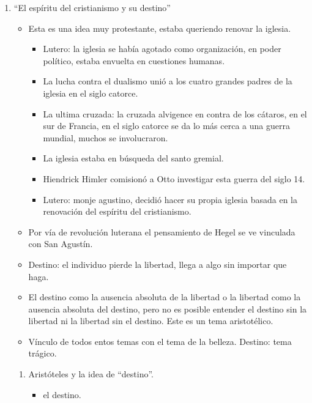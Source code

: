 \begin{enumerate}
    \item ``El espíritu del cristianismo y su destino''
        \begin{itemize}
            \item Esta es una idea muy protestante, estaba queriendo renovar la iglesia. 
                \begin{itemize}
                    \item Lutero: la iglesia se había agotado como organización, en poder político, estaba envuelta en cuestiones humanas. 
                    \item La lucha contra el dualismo unió a los cuatro grandes padres de la iglesia en el siglo catorce. 
                    \item La ultima cruzada: la cruzada alvigence en contra de los cátaros, en el sur de Francia, en el siglo catorce se da lo más cerca a una guerra mundial, muchos se involucraron.
                    \item La iglesia estaba en búsqueda del santo gremial. 
                    \item Hiendrick Himler comisionó a Otto investigar esta guerra del siglo 14. 
                    \item Lutero: monje agustino, decidió hacer su propia iglesia basada en la renovación del espíritu del cristianismo. 
                \end{itemize}
            \item Por vía de revolución luterana el pensamiento de Hegel se ve vinculada con San Agustín. 
            \item Destino: el individuo pierde la libertad, llega a algo sin importar que haga. 
            \item El destino como la ausencia absoluta de la libertad o la libertad como la ausencia absoluta del destino, pero no es posible entender el destino sin la libertad ni la libertad sin el destino. Este es un tema aristotélico. 
            \item Vínculo de todos entos temas con el tema de la belleza. Destino: tema trágico. 
        \end{itemize}
        \begin{enumerate}
            \item Aristóteles y la idea de ``destino''.
                \begin{itemize}
                    \item {}  el destino. 

\end{itemize}
\end{enumerate}
\end{enumerate}
